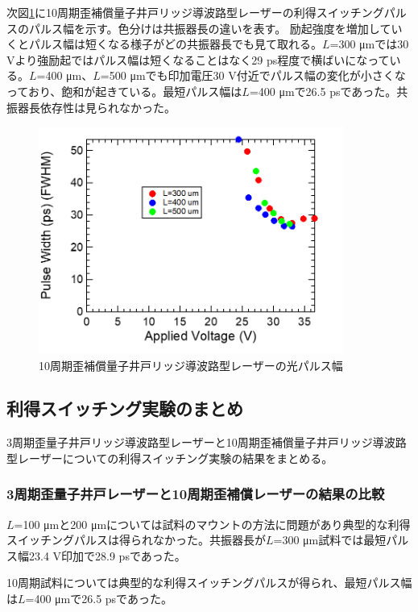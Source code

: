 {次図\ref{fig:fig_3_2_10QW_ridge_GS_FWHM}に10周期歪補償量子井戸リッジ導波路型レーザーの利得スイッチングパルスのパルス幅を示す。色分けは共振器長の違いを表す。
励起強度を増加していくとパルス幅は短くなる様子がどの共振器長でも見て取れる。$L$=300 \si{\micro\metre}では30 Vより強励起ではパルス幅は短くなることはなく29 ps程度で横ばいになっている。$L$=400 \si{\micro\metre}、$L$=500 \si{\micro\metre}でも印加電圧30 V付近でパルス幅の変化が小さくなっており、飽和が起きている。最短パルス幅は$L$=400 \si{\micro\metre}で26.5 psであった。共振器長依存性は見られなかった。
\begin{figure}[h]
	\centering
	\includegraphics[width=10cm]{figure/fig_3_2_10QW_ridge_GS_FWHM.png}
		\caption{10周期歪補償量子井戸リッジ導波路型レーザーの光パルス幅}
		\label{fig:fig_3_2_10QW_ridge_GS_FWHM}
\end{figure}

\subsection{利得スイッチング実験のまとめ}%

3周期歪量子井戸リッジ導波路型レーザーと10周期歪補償量子井戸リッジ導波路型レーザーについての利得スイッチング実験の結果をまとめる。


\subsubsection{3周期歪量子井戸レーザーと10周期歪補償レーザーの結果の比較}
$L$=100 \si{\micro\metre}と200 \si{\micro\metre}については試料のマウントの方法に問題があり典型的な利得スイッチングパルスは得られなかった。共振器長が$L$=300 \si{\micro\metre}試料では最短パルス幅23.4 V印加で28.9 psであった。

10周期試料については典型的な利得スイッチングパルスが得られ、最短パルス幅は$L$=400 \si{\micro\metre}で26.5 psであった。

}
